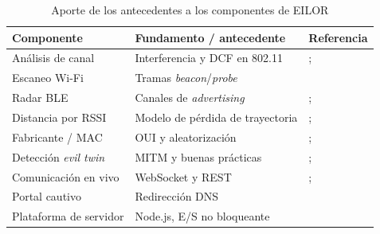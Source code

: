 \begin{table}[H]
\centering
\caption{Aporte de los antecedentes a los componentes de EILOR}
\label{tab:antecedentes}
\footnotesize
\begin{tabularx}{\linewidth}{@{}>{\raggedright\arraybackslash}p{3.1cm} >{\raggedright\arraybackslash}X >{\raggedright\arraybackslash}p{4.0cm}@{}}
\toprule
\textbf{Componente} & \textbf{Fundamento / antecedente} & \textbf{Referencia} \\
\midrule
Análisis de canal & Interferencia y DCF en 802.11 & \textcite{gast2005}; \textcite{bianchi2000} \\
Escaneo Wi-Fi & Tramas \emph{beacon}/\emph{probe} & \textcite{ieee80211} \\
Radar BLE & Canales de \emph{advertising} & \textcite{bluetooth54}; \textcite{heydon2013} \\
Distancia por RSSI & Modelo de pérdida de trayectoria & \textcite{rappaport2002}; \textcite{bahl2000} \\
Fabricante / MAC & OUI y aleatorización & \textcite{ieeeoui}; \textcite{martin2017} \\
Detección \emph{evil twin} & MITM y buenas prácticas & \textcite{callegati2009}; \textcite{owasp2021} \\
Comunicación en vivo & WebSocket y REST & \textcite{rfc6455}; \textcite{fielding2002} \\
Portal cautivo & Redirección DNS & \textcite{rfc1035} \\
Plataforma de servidor & Node.js, E/S no bloqueante & \textcite{nodejs2024} \\
\bottomrule
\end{tabularx}
\end{table}
